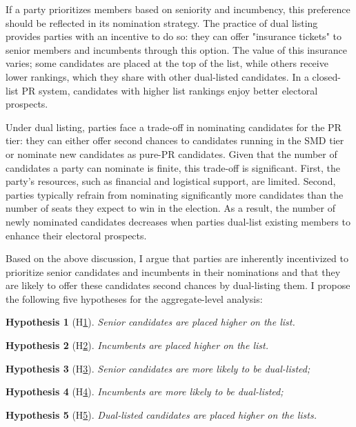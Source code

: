 \documentclass[a4paper, 11pt]{article}
\newtheorem{hyp}{Hypothesis}
\begin{document}
If a party prioritizes members based on seniority and incumbency, this preference should be reflected in its nomination strategy. The practice of dual listing provides parties with an incentive to do so: they can offer "insurance tickets" to senior members and incumbents through this option. The value of this insurance varies; some candidates are placed at the top of the list, while others receive lower rankings, which they share with other dual-listed candidates. In a closed-list PR system, candidates with higher list rankings enjoy better electoral prospects.

Under dual listing, parties face a trade-off in nominating candidates for the PR tier: they can either offer second chances to candidates running in the SMD tier or nominate new candidates as pure-PR candidates. Given that the number of candidates a party can nominate is finite, this trade-off is significant. First, the party's resources, such as financial and logistical support, are limited. Second, parties typically refrain from nominating significantly more candidates than the number of seats they expect to win in the election. As a result, the number of newly nominated candidates decreases when parties dual-list existing members to enhance their electoral prospects.

Based on the above discussion, I argue that parties are inherently incentivized to prioritize senior candidates and incumbents in their nominations and that they are likely to offer these candidates second chances by dual-listing them. I propose the following five hypotheses for the aggregate-level analysis:

\begin{hyp}[H\ref{hyp:first}] \label{hyp:first}
Senior candidates are placed higher on the list. 
\end{hyp}

\begin{hyp}[H\ref{hyp:second}] \label{hyp:second}
Incumbents are placed higher on the list. 
\end{hyp}

\begin{hyp}[H\ref{hyp:third}] \label{hyp:third}
Senior candidates are more likely to be dual-listed; 
\end{hyp}

\begin{hyp}[H\ref{hyp:fourth}] \label{hyp:fourth}
Incumbents are more likely to be dual-listed; 
\end{hyp}

\begin{hyp}[H\ref{hyp:fifth}] \label{hyp:fifth}
Dual-listed candidates are placed higher on the lists. 
\end{hyp}
\end{document}
